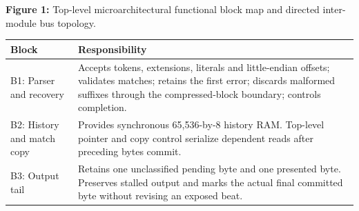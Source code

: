 \documentclass[11pt,a4paper]{article}
\begin{document}
\begin{center}
\begin{minipage}{\textwidth}
\par\vspace{3pt}

{\small\textbf{Figure 1:} Top-level microarchitectural functional block map and directed inter-module bus topology.}\end{minipage}\end{center}

{\small\renewcommand{\arraystretch}{1.18}\begin{longtable}{@{}L{0.24\textwidth}|L{0.7\textwidth}@{}}\toprule

\textbf{Block} & \textbf{Responsibility}\\\midrule\endhead

B1: Parser and recovery & Accepts tokens,\allowbreak{} extensions,\allowbreak{} literals and little-endian offsets; validates matches; retains the first error; discards malformed suffixes through the compressed-block boundary; controls completion.\\[2pt]\hline

B2: History and match copy & Provides synchronous 65,\allowbreak{}536-by-8 history RAM. Top-level pointer and copy control serialize dependent reads after preceding bytes commit.\\[2pt]\hline

B3: Output tail & Retains one unclassified pending byte and one presented byte. Preserves stalled output and marks the actual final committed byte without revising an exposed beat.\\[2pt]\hline

\bottomrule\end{longtable}}
\end{document}
